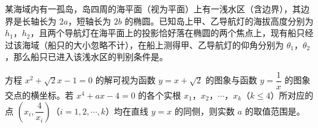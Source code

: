 \begin{question}
某海域内有一孤岛，岛四周的海平面（视为平面）上有一浅水区（含边界），其边界是长轴长为 $2a$，短轴长为 $2b$ 的椭圆。已知岛上甲、乙导航灯的海拔高度分别为 $h_1$，$h_2$，且两个导航灯在海平面上的投影恰好落在椭圆的两个焦点上，现有船只经过该海域（船只的大小忽略不计），在船上测得甲、乙导航灯的仰角分别为 $\theta_1$，$\theta_2$，那么船只已进入该浅水区的判别条件是\gkblank{}。

\end{question}
\begin{question}
方程 $x^2+\sqrt2x-1=0$ 的解可视为函数 $y=x+\sqrt2$ 的图象与函数 $y=\dfrac1x$ 的图象交点的横坐标。若 $x^4+ax-4=0$ 的各个实根 $x_1$，$x_2$，$\cdots$，$x_k$（$k\leqslant4$）所对应的点 $\left(x_i,\dfrac4{x_i}\right)$（$i=1,2,\cdots,k$）均在直线 $y=x$ 的同侧，则实数 $a$ 的取值范围是\gkblank{}。

\end{question}


